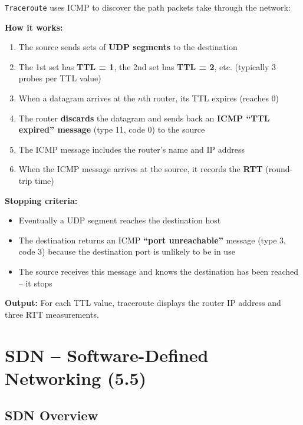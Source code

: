 \begin{exambox}
\texttt{Traceroute} uses ICMP to discover the path packets take through the network:

\textbf{How it works:}
\begin{enumerate}[noitemsep]
    \item The source sends sets of \textbf{UDP segments} to the destination
    \item The 1st set has \textbf{TTL = 1}, the 2nd set has \textbf{TTL = 2}, etc. (typically 3 probes per TTL value)
    \item When a datagram arrives at the $n$th router, its TTL expires (reaches 0)
    \item The router \textbf{discards} the datagram and sends back an \textbf{ICMP ``TTL expired'' message} (type 11, code 0) to the source
    \item The ICMP message includes the router's name and IP address
    \item When the ICMP message arrives at the source, it records the \textbf{RTT} (round-trip time)
\end{enumerate}

\textbf{Stopping criteria:}
\begin{itemize}[noitemsep]
    \item Eventually a UDP segment reaches the destination host
    \item The destination returns an ICMP \textbf{``port unreachable''} message (type 3, code 3) because the destination port is unlikely to be in use
    \item The source receives this message and knows the destination has been reached -- it stops
\end{itemize}

\medskip
\textbf{Output:} For each TTL value, traceroute displays the router IP address and three RTT measurements.
\end{exambox}

\section{SDN -- Software-Defined Networking (5.5)}

\subsection{SDN Overview}

